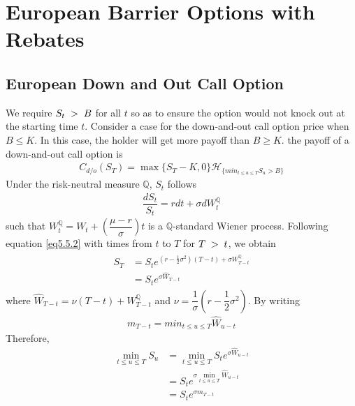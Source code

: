 
\chapter{European Barrier Options with Rebates}

\section{European Down and Out Call Option}

\fontsize{11pt}{20pt}\selectfont We require $S_t\hspace{0.1cm} > \hspace{0.1cm} B$ for all $t$ so as to ensure the option would not knock out at the starting
time $t$. Consider a case for the down-and-out call option price when $B \leq K$. In this case, the holder will get more payoff than $B \geq K$. the payoff of a down-and-out call option is
\begin{align*}
C_{d/o}(S_T)=\max\{S_T-K, 0\}\mathcal{H}_{\{min_{t\leq u\leq T}S_u > B\}}
\end{align*}
Under the risk-neutral measure $\mathbb{Q}$, $S_t$ follows
\begin{align*}
\dfrac{dS_t}{S_t}=rdt+\sigma dW_t^\mathbb{Q}
\end{align*}
such that $W_t^\mathbb{Q}=W_t+\left(\dfrac{\mu-r}{\sigma}\right)t$ \hspace{0.1cm}is a $\mathbb{Q}$-standard Wiener process. Following equation \eqref{eq5.5.2} with times from $t$ to $T$ for $T\hspace{0.1cm}>\hspace{0.1cm}t$, we obtain
\begin{align}
\begin{split}
S_T&=S_te^{\left(r -\frac{1}{2}\sigma^2 \right)(T-t)+\sigma W_{T-t}^\mathbb{Q}}\\
&=S_te^{\sigma \widehat{W}_{T-t}}
\end{split} \label{eq4.1.1}
\end{align} 
where $\widehat{W}_{T-t}=\nu (T-t)+W_{T-t}^\mathbb{Q}$ and $\nu=\dfrac{1}{\sigma}(r-\dfrac{1}{2}\sigma^2)$. By writing
\begin{align*}
	m_{T-t}=min_{t\leq u \leq T}\widehat{W}_{u-t}
\end{align*}
Therefore, 
\begin{align*}
\displaystyle \min_{t\leq u \leq T}S_u&=\displaystyle \min_{t\leq u \leq T}S_te^{\sigma \widehat{W}_{u-t}} \\
&=S_te^{\sigma \min_{t\leq u \leq T}\widehat{W}_{u-t}}\\
&=S_te^{\sigma 	m_{T-t}}
\end{align*} 
